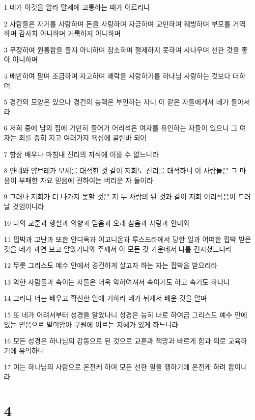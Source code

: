 \par 1 네가 이것을 알라 말세에 고통하는 때가 이르리니
\par 2 사람들은 자기를 사랑하며 돈을 사랑하며 자긍하며 교만하며 훼방하며 부모를 거역하며 감사치 아니하며 거룩하지 아니하며
\par 3 무정하며 원통함을 풀지 아니하며 참소하며 절제하지 못하며 사나우며 선한 것을 좋아 아니하며
\par 4 배반하여 팔며 조급하며 자고하며 쾌락을 사랑하기를 하나님 사랑하는 것보다 더하며
\par 5 경건의 모양은 있으나 경건의 능력은 부인하는 자니 이 같은 자들에게서 네가 돌아서라
\par 6 저희 중에 남의 집에 가만히 들어가 어리석은 여자를 유인하는 자들이 있으니 그 여자는 죄를 중히 지고 여러가지 욕심에 끌린바 되어
\par 7 항상 배우나 마침내 진리의 지식에 이를 수 없느니라
\par 8 얀네와 얌브레가 모세를 대적한 것 같이 저희도 진리를 대적하니 이 사람들은 그 마음이 부패한 자요 믿음에 관하여는 버리운 자 들이라
\par 9 그러나 저희가 더 나가지 못할 것은 저 두 사람의 된 것과 같이 저희 어리석음이 드러날 것임이니라
\par 10 나의 교훈과 행실과 의향과 믿음과 오래 참음과 사랑과 인내와
\par 11 핍박과 고난과 또한 안디옥과 이고니온과 루스드라에서 당한 일과 어떠한 핍박 받은 것을 네가 과연 보고 알았거니와 주께서 이 모든 것 가운데서 나를 건지셨느니라
\par 12 무릇 그리스도 예수 안에서 경건하게 살고자 하는 자는 핍박을 받으리라
\par 13 악한 사람들과 속이는 자들은 더욱 악하여져서 속이기도 하고 속기도 하나니
\par 14 그러나 너는 배우고 확신한 일에 거하라 네가 뉘게서 배운 것을 알며
\par 15 또 네가 어려서부터 성경을 알았나니 성경은 능히 너로 하여금 그리스도 예수 안에 있는 믿음으로 말미암아 구원에 이르는 지혜가 있게 하느니라
\par 16 모든 성경은 하나님의 감동으로 된 것으로 교훈과 책망과 바르게 함과 의로 교육하기에 유익하니
\par 17 이는 하나님의 사람으로 온전케 하며 모든 선한 일을 행하기에 온전케 하려 함이니라

\chapter{4}

